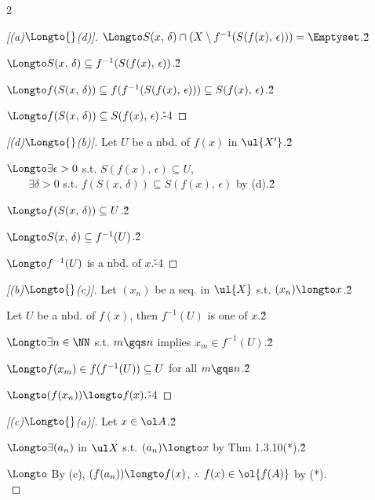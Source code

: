 \documentclass[dvipdfmx,a4paper,titlepage,9pt]{jsarticle}
\begin{document}
\begin{multicols*}{2}
\begin{itemize}[label=-]
\begin{pfbox}
\begin{proof}[{[(a)${}\Longto{}$(d)]}]
$\Longto S(x,\,\delta)\cap(X\setminus f^{-1}(S(f(x),\,\epsilon)))=\Emptyset$.\v2

$\Longto S(x,\,\delta)\subseteq f^{-1}(S(f(x),\,\epsilon))$.\v2

$\Longto f(S(x,\,\delta))\subseteq f(f^{-1}(S(f(x),\,\epsilon)))\subseteq S(f(x),\,\epsilon)$.\v2

$\Longto f(S(x,\,\delta))\subseteq S(f(x),\,\epsilon)$.\v{-4}
\end{proof}

\dotfill

\begin{proof}[{[(d)${}\Longto{}$(b)]}]
Let $U$ be a nbd. of $f(x)$ in $\ul{X'}$.\v2

$\Longto \exists\epsilon>0$ s.t. $S(f(x),\,\epsilon)\subseteq U$,\\
$\qquad\!\exists\delta>0$ s.t. $f(S(x,\,\delta))\subseteq S(f(x),\,\epsilon)$ by (d).\v2

$\Longto f(S(x,\,\delta))\subseteq U$.\v2

$\Longto S(x,\,\delta)\subseteq f^{-1}(U)$.\v2

$\Longto f^{-1}(U)$ is a nbd. of $x$.\v{-4}
\end{proof}

\dotfill

\begin{proof}[{[(b)${}\Longto{}$(c)]}]
Let $(x_n)$ be a seq. in $\ul{X}$ s.t. $(x_n)\longto x$.\v2

Let $U$ be a nbd. of $f(x)$, then $f^{-1}(U)$ is one of $x$.\v2

$\Longto \exists n\in\NN$ s.t. $m\gqs n$ implies $x_m\in f^{-1}(U)$.\v2

$\Longto f(x_m)\in f(f^{-1}(U))\subseteq U$ for all $m\gqs n$.\v2

$\Longto (f(x_n))\longto f(x).$\v{-4}
\end{proof}

\dotfill\rnc{\qedsymbol}{\Bsq}

\begin{proof}[{[(c)${}\Longto{}$(a)]}] Let $x\in\ol A$.\v2

$\Longto\exists (a_n)$ in $\ul X$ s.t. $(a_n)\longto x$ by Thm 1.3.10(*).\v2

$\Longto$ By (c), $(f(a_n))\longto f(x)$, \;$\therefore$ $f(x)\in\ol{f(A)}$ by (*).\\
\end{proof}
\end{pfbox}

\newpage


\end{itemize}
\end{multicols*}
\end{document}
